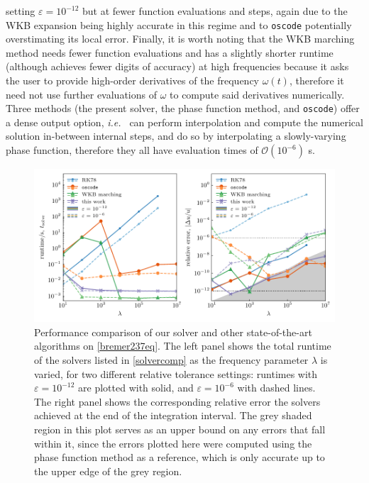 \documentclass[10pt]{article}
\newcommand{\ie}{{\it i.e.\ }}
\newcommand{\om}{\omega}
\begin{document}
setting $\varepsilon = 10^{-12}$ but at fewer function evaluations and steps,
again due to the WKB expansion being highly accurate in this regime and to
\texttt{oscode} potentially overstimating its local error. Finally, it is worth
noting that the WKB marching method needs fewer function evaluations and has a
slightly shorter runtime (although achieves fewer digits of accuracy) at high
frequencies because it asks the user to provide high-order derivatives of the
frequency $\om(t)$, therefore it need not use further evaluations of $\om$ to
compute said derivatives numerically. Three methods (the present solver, the
phase function method, and \texttt{oscode}) offer a dense output option, \ie
can perform interpolation and compute the numerical solution in-between
internal steps, and do so by interpolating a slowly-varying phase function,
therefore they all have evaluation times of $\mathcal{O}(10^{-6})$ \si{\s}.  

\begin{figure}[tb]
    \centering
    \includegraphics{plots/bremer237-timing.pdf}
    \caption{\label{bremer237-timing} Performance comparison of our solver and
    other state-of-the-art algorithms on \cref{bremer237eq}. The left panel
    shows the total runtime of the solvers listed in \cref{solvercomp} as the
    frequency parameter $\lambda$ is varied, for two different relative
    tolerance settings: runtimes with $\varepsilon = 10^{-12}$ are plotted with
    solid, and $\varepsilon = 10^{-6}$ with dashed lines. The right panel shows
    the corresponding relative error the solvers achieved at the end of the
    integration interval. The grey shaded region in this plot serves as an
    upper bound on any errors that fall within it, since the errors plotted
    here were computed using the phase function method as a reference, which is
    only accurate up to the upper edge of the grey region.}
\end{figure}
\end{document}
